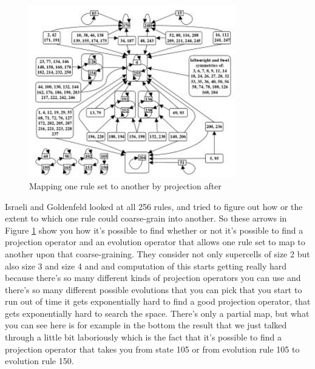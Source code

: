 \documentclass[]{article}
\begin{document}
\begin{figure}[H]
	\begin{center}
		\caption[Mapping one rule set to another by projection]{Mapping one rule set to another by projection after \cite{israeli2006coarse}}\label{fig:ig-relationships}
		\includegraphics[width=0.8\textwidth]{ig-relationships}
	\end{center}
\end{figure}
Israeli and Goldenfeld looked at all 256 rules, and  tried to figure out how or the extent to which one rule could coarse-grain into another.
So these arrows in Figure \ref{fig:ig-relationships} show you how it's possible
to find whether or not it's possible to find a projection operator and an evolution operator that allows one rule set to map to another upon that coarse-graining.
They consider not only supercells of size 2 but also size 3 and size 4 and and computation of this starts getting really hard because there's so many different kinds of projection operators you can use and there's so many different possible evolutions that you can pick that you start to run out of time it gets exponentially hard to find a good projection operator, that gets exponentially hard to search the space. There's only a partial map, but what you can see here is for example
in the bottom the result that we just talked through a little bit laboriously which is the fact that it's possible to find a projection operator that takes you from state 105 or from evolution rule 105 to evolution rule 150.
\end{document}
